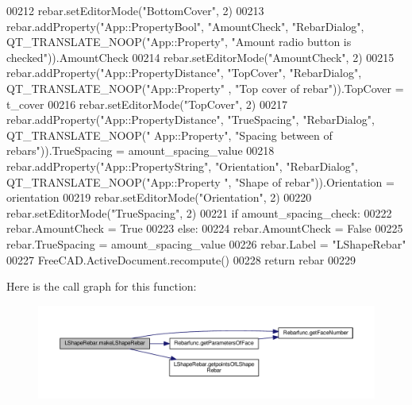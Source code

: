 \begin{DoxyCode}
00212     rebar.setEditorMode(\textcolor{stringliteral}{"BottomCover"}, 2)
00213     rebar.addProperty(\textcolor{stringliteral}{"App::PropertyBool"}, \textcolor{stringliteral}{"AmountCheck"}, \textcolor{stringliteral}{"RebarDialog"}, QT\_TRANSLATE\_NOOP(\textcolor{stringliteral}{"App::Property"},
       \textcolor{stringliteral}{"Amount radio button is checked"})).AmountCheck
00214     rebar.setEditorMode(\textcolor{stringliteral}{"AmountCheck"}, 2)
00215     rebar.addProperty(\textcolor{stringliteral}{"App::PropertyDistance"}, \textcolor{stringliteral}{"TopCover"}, \textcolor{stringliteral}{"RebarDialog"}, QT\_TRANSLATE\_NOOP(\textcolor{stringliteral}{"App::Property"}
      , \textcolor{stringliteral}{"Top cover of rebar"})).TopCover = t\_cover
00216     rebar.setEditorMode(\textcolor{stringliteral}{"TopCover"}, 2)
00217     rebar.addProperty(\textcolor{stringliteral}{"App::PropertyDistance"}, \textcolor{stringliteral}{"TrueSpacing"}, \textcolor{stringliteral}{"RebarDialog"}, QT\_TRANSLATE\_NOOP(\textcolor{stringliteral}{"
      App::Property"}, \textcolor{stringliteral}{"Spacing between of rebars"})).TrueSpacing = amount\_spacing\_value
00218     rebar.addProperty(\textcolor{stringliteral}{"App::PropertyString"}, \textcolor{stringliteral}{"Orientation"}, \textcolor{stringliteral}{"RebarDialog"}, QT\_TRANSLATE\_NOOP(\textcolor{stringliteral}{"App::Property
      "}, \textcolor{stringliteral}{"Shape of rebar"})).Orientation = orientation
00219     rebar.setEditorMode(\textcolor{stringliteral}{"Orientation"}, 2)
00220     rebar.setEditorMode(\textcolor{stringliteral}{"TrueSpacing"}, 2)
00221     \textcolor{keywordflow}{if} amount\_spacing\_check:
00222         rebar.AmountCheck = \textcolor{keyword}{True}
00223     \textcolor{keywordflow}{else}:
00224         rebar.AmountCheck = \textcolor{keyword}{False}
00225         rebar.TrueSpacing = amount\_spacing\_value
00226     rebar.Label = \textcolor{stringliteral}{"LShapeRebar"}
00227     FreeCAD.ActiveDocument.recompute()
00228     \textcolor{keywordflow}{return} rebar
00229 
\end{DoxyCode}


Here is the call graph for this function\+:\nopagebreak
\begin{figure}[H]
\begin{center}
\leavevmode
\includegraphics[width=350pt]{namespaceLShapeRebar_a647a28e94933108c6617da8532d76998_cgraph}
\end{center}
\end{figure}




